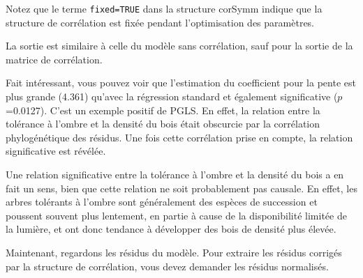 \documentclass[
]{book}
\begin{document}
Notez que le terme \texttt{fixed=TRUE} dans la structure corSymm indique que la structure de corrélation est fixée pendant l'optimisation des paramètres.

La sortie est similaire à celle du modèle sans corrélation, sauf pour la sortie de la matrice de corrélation.

Fait intéressant, vous pouvez voir que l'estimation du coefficient pour la pente est plus grande (4.361) qu'avec la régression standard et également significative (\(p\)=0.0127). C'est un exemple positif de PGLS. En effet, la relation entre la tolérance à l'ombre et la densité du bois était obscurcie par la corrélation phylogénétique des résidus. Une fois cette corrélation prise en compte, la relation significative est révélée.

Une relation significative entre la tolérance à l'ombre et la densité du bois a en fait un sens, bien que cette relation ne soit probablement pas causale. En effet, les arbres tolérants à l'ombre sont généralement des espèces de succession et poussent souvent plus lentement, en partie à cause de la disponibilité limitée de la lumière, et ont donc tendance à développer des bois de densité plus élevée.

Maintenant, regardons les résidus du modèle. Pour extraire les résidus corrigés par la structure de corrélation, vous devez demander les résidus normalisés.
\end{document}
